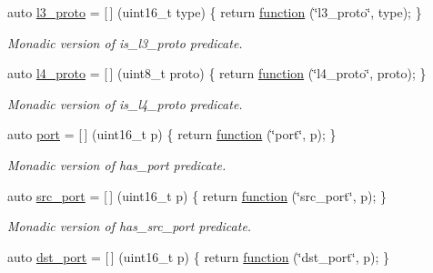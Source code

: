 \begin{DoxyCompactItemize}
auto \hyperlink{namespacepfq_1_1lang_1_1anonymous__namespace_02default_8hpp_03_a1515f230673119530cd04f213627976f}{l3\+\_\+proto} = \mbox{[}$\,$\mbox{]} (uint16\+\_\+t type) \{ return \hyperlink{namespacepfq_1_1lang_a1a4638059d700ae08d0ca63886ff2bb3}{function} (\char`\"{}l3\+\_\+proto\char`\"{}, type); \}
\begin{DoxyCompactList}\small\item\em Monadic version of {\ttfamily is\+\_\+l3\+\_\+proto} predicate. \end{DoxyCompactList}\item 
auto \hyperlink{namespacepfq_1_1lang_1_1anonymous__namespace_02default_8hpp_03_a8ad2208c91dc3cd4378e715aab5fb4b7}{l4\+\_\+proto} = \mbox{[}$\,$\mbox{]} (uint8\+\_\+t proto) \{ return \hyperlink{namespacepfq_1_1lang_a1a4638059d700ae08d0ca63886ff2bb3}{function} (\char`\"{}l4\+\_\+proto\char`\"{}, proto); \}
\begin{DoxyCompactList}\small\item\em Monadic version of {\ttfamily is\+\_\+l4\+\_\+proto} predicate. \end{DoxyCompactList}\item 
auto \hyperlink{namespacepfq_1_1lang_1_1anonymous__namespace_02default_8hpp_03_a868eca03290a037cb4e9b7075085888b}{port} = \mbox{[}$\,$\mbox{]} (uint16\+\_\+t p) \{ return \hyperlink{namespacepfq_1_1lang_a1a4638059d700ae08d0ca63886ff2bb3}{function} (\char`\"{}port\char`\"{}, p); \}
\begin{DoxyCompactList}\small\item\em Monadic version of {\ttfamily has\+\_\+port} predicate. \end{DoxyCompactList}\item 
auto \hyperlink{namespacepfq_1_1lang_1_1anonymous__namespace_02default_8hpp_03_ad1645151270994a4f396565b70233b73}{src\+\_\+port} = \mbox{[}$\,$\mbox{]} (uint16\+\_\+t p) \{ return \hyperlink{namespacepfq_1_1lang_a1a4638059d700ae08d0ca63886ff2bb3}{function} (\char`\"{}src\+\_\+port\char`\"{}, p); \}
\begin{DoxyCompactList}\small\item\em Monadic version of {\ttfamily has\+\_\+src\+\_\+port} predicate. \end{DoxyCompactList}\item 
auto \hyperlink{namespacepfq_1_1lang_1_1anonymous__namespace_02default_8hpp_03_a25a3b35caf255c109a6c5b4f601b1b61}{dst\+\_\+port} = \mbox{[}$\,$\mbox{]} (uint16\+\_\+t p) \{ return \hyperlink{namespacepfq_1_1lang_a1a4638059d700ae08d0ca63886ff2bb3}{function} (\char`\"{}dst\+\_\+port\char`\"{}, p); \}

\end{DoxyCompactItemize}
